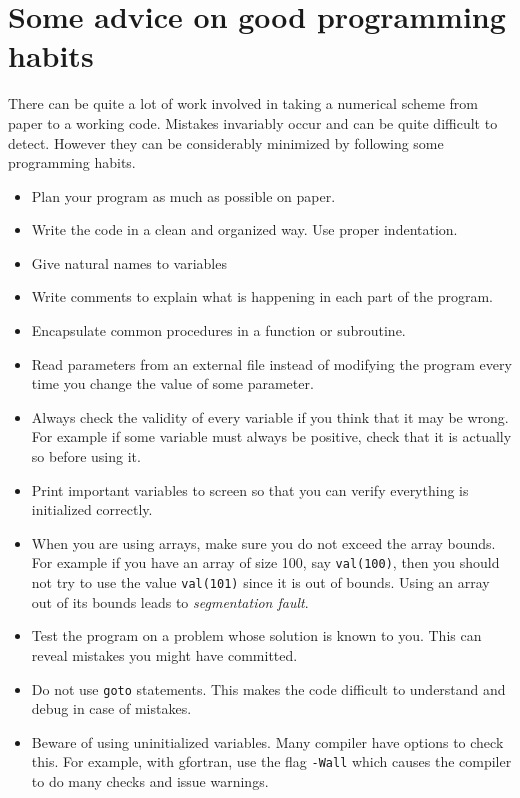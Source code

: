 \documentclass[11pt,oneside]{amsart}
\begin{document}
\section{Some advice on good programming habits}

There can be quite a lot of work involved in taking a numerical scheme from paper to a working code. Mistakes invariably occur and can be quite difficult to detect. However they can be considerably minimized by following some programming habits.

\begin{itemize}

\item Plan your program as much as possible on paper.

\item Write the code in a clean and organized way. Use proper indentation.

\item Give natural names to variables

\item Write comments to explain what is happening in each part of the program.

\item Encapsulate common procedures in a function or subroutine.

\item Read parameters from an external file instead of modifying the program every time you change the value of some parameter.

\item Always check the validity of every variable if you think that it may be wrong. For example if some variable must always be positive, check that it is actually so before using it.

\item Print important variables to screen so that you can verify everything is initialized correctly.

\item When you are using arrays, make sure you do not exceed the array bounds. For example if you have an array of size 100, say {\tt val(100)}, then you should not try to use the value {\tt val(101)} since it is out of bounds. Using an array out of its bounds leads to {\em segmentation fault}.

\item Test the program on a problem whose solution is known to you. This can reveal mistakes you might have committed.

\item Do not use {\tt goto} statements. This makes the code difficult to understand and debug in case of mistakes.

\item Beware of using uninitialized variables. Many compiler have options to check this. For example, with gfortran, use the flag {\tt -Wall} which causes the compiler to do many checks and issue warnings.

\end{itemize}
\end{document}
